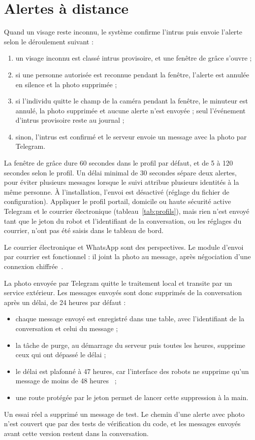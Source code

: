 \section{Alertes à distance}

Quand un visage reste inconnu, le système confirme l'intrus puis envoie l'alerte selon le déroulement suivant :
\begin{enumerate}
  \item un visage inconnu est classé intrus provisoire, et une fenêtre de grâce s'ouvre ;
  \item si une personne autorisée est reconnue pendant la fenêtre, l'alerte est annulée en silence et la photo supprimée ;
  \item si l'individu quitte le champ de la caméra pendant la fenêtre, le minuteur est annulé, la photo supprimée et aucune alerte n'est envoyée ; seul l'événement d'intrus provisoire reste au journal ;
  \item sinon, l'intrus est confirmé et le serveur envoie un message avec la photo par Telegram.
\end{enumerate}
La fenêtre de grâce dure 60 secondes dans le profil par défaut, et de 5 à 120 secondes selon le profil. Un délai minimal de 30 secondes sépare deux alertes, pour éviter plusieurs messages lorsque le suivi attribue plusieurs identités à la même personne. À l'installation, l'envoi est désactivé (réglage du fichier de configuration). Appliquer le profil portail, domicile ou haute sécurité active Telegram et le courrier électronique (tableau~\ref{tab:profils}), mais rien n'est envoyé tant que le jeton du robot et l'identifiant de la conversation, ou les réglages du courrier, n'ont pas été saisis dans le tableau de bord.

Le courrier électronique et WhatsApp sont des perspectives. Le module d'envoi par courrier est fonctionnel : il joint la photo au message, après négociation d'une connexion chiffrée~\cite{rfc3207}.

La photo envoyée par Telegram quitte le traitement local et transite par un service extérieur. Les messages envoyés sont donc supprimés de la conversation après un délai, de 24 heures par défaut :
\begin{itemize}
  \item chaque message envoyé est enregistré dans une table, avec l'identifiant de la conversation et celui du message ;
  \item la tâche de purge, au démarrage du serveur puis toutes les heures, supprime ceux qui ont dépassé le délai ;
  \item le délai est plafonné à 47 heures, car l'interface des robots ne supprime qu'un message de moins de 48 heures~\cite{telegram_botapi} ;
  \item une route protégée par le jeton permet de lancer cette suppression à la main.
\end{itemize}
Un essai réel a supprimé un message de test. Le chemin d'une alerte avec photo n'est couvert que par des tests de vérification du code, et les messages envoyés avant cette version restent dans la conversation.

